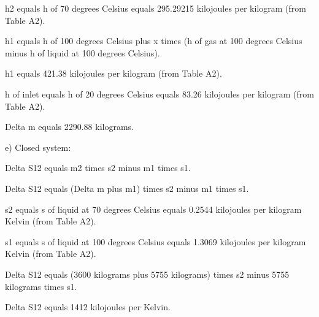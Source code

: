 h2 equals h of 70 degrees Celsius equals 295.29215 kilojoules per kilogram (from Table A2).  

h1 equals h of 100 degrees Celsius plus x times (h of gas at 100 degrees Celsius minus h of liquid at 100 degrees Celsius).  

h1 equals 421.38 kilojoules per kilogram (from Table A2).  

h of inlet equals h of 20 degrees Celsius equals 83.26 kilojoules per kilogram (from Table A2).  

Delta m equals 2290.88 kilograms.  

e) Closed system:  

Delta S12 equals m2 times s2 minus m1 times s1.  

Delta S12 equals (Delta m plus m1) times s2 minus m1 times s1.  

s2 equals s of liquid at 70 degrees Celsius equals 0.2544 kilojoules per kilogram Kelvin (from Table A2).  

s1 equals s of liquid at 100 degrees Celsius equals 1.3069 kilojoules per kilogram Kelvin (from Table A2).  

Delta S12 equals (3600 kilograms plus 5755 kilograms) times s2 minus 5755 kilograms times s1.  

Delta S12 equals 1412 kilojoules per Kelvin.